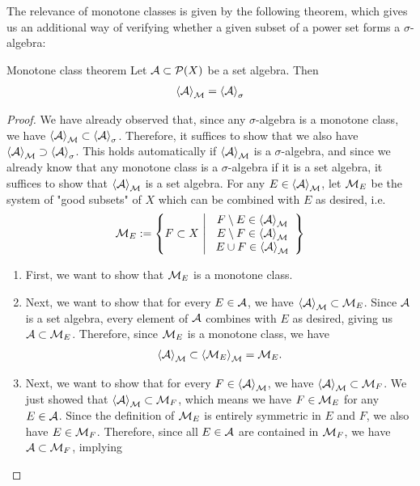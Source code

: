 The relevance of monotone classes is given by the following theorem, which gives us an additional way of verifying whether a given subset of a power set forms a $\sigma$-algebra:
\begin{importanttheorem}{Monotone class theorem}{}
	Let $\mathcal{A} \subset \mathcal{P}(X)$ be a set algebra. Then
	\begin{align*}
		\left\langle \mathcal{A} \right\rangle_{\mathcal{M}} 
		=
		\left\langle \mathcal{A} \right\rangle_\sigma
	\end{align*}
\end{importanttheorem}
\begin{proof}
	We have already observed that, since any $\sigma$-algebra is a monotone class, we have $\left\langle \mathcal{A} \right\rangle_{\mathcal{M}} \subset \left\langle \mathcal{A} \right\rangle_\sigma$. Therefore, it suffices to show that we also have $\left\langle \mathcal{A} \right\rangle_{\mathcal{M}} \supset \left\langle \mathcal{A} \right\rangle_\sigma$. This holds automatically if $\left\langle \mathcal{A} \right\rangle_{\mathcal{M}}$ is a $\sigma$-algebra, and since we already know that any monotone class is a $\sigma$-algebra if it is a set algebra, it suffices to show that $\left\langle \mathcal{A} \right\rangle_{\mathcal{M}}$ is a set algebra.
	\newpar
	For any $E \in \left\langle \mathcal{A} \right\rangle_{\mathcal{M}}$, let $\mathcal{M}_E$ be the system of "good subsets" of $X$ which can be combined with $E$ as desired, i.e.
	\begin{align*}
		\mathcal{M}_E := \qty{F \subset X ~\middle|~\begin{array}{c}
				F \setminus E \in \left\langle \mathcal{A}\right\rangle_{\mathcal{M}}\\
				E \setminus F \in \left\langle \mathcal{A}\right\rangle_{\mathcal{M}}\\
				E \cup F \in \left\langle \mathcal{A}\right\rangle_{\mathcal{M}}\end{array}}
	\end{align*}
	\begin{enumerate}
		\item First, we want to show that $\mathcal{M}_E$ is a monotone class.
		\item Next, we want to show that for every $E \in \mathcal{A}$, we have $\left\langle \mathcal{A} \right\rangle_{\mathcal{M}} \subset \mathcal{M}_E$. Since $\mathcal{A}$ is a set algebra, every element of $\mathcal{A}$ combines with $E$ as desired, giving us $\mathcal{A} \subset \mathcal{M}_E$. Therefore, since $\mathcal{M}_E$ is a monotone class, we have 
		\begin{align*}
			\left\langle \mathcal{A} \right\rangle_{\mathcal{M}} \subset \left\langle \mathcal{M}_E \right\rangle_{\mathcal{M}} = \mathcal{M}_E.
		\end{align*}
		\item Next, we want to show that for every $F \in \left\langle \mathcal{A} \right\rangle_{\mathcal{M}}$, we have $\left\langle \mathcal{A} \right\rangle_{\mathcal{M}} \subset \mathcal{M}_F$. We just showed that $\left\langle \mathcal{A} \right\rangle_{\mathcal{M}} \subset \mathcal{M}_F$, which means we have $F \in \mathcal{M}_E$ for any $E \in \mathcal{A}$. Since the definition of $\mathcal{M}_E$ is entirely symmetric in $E$ and $F$, we also have $E \in \mathcal{M}_F$. Therefore, since all $E \in \mathcal{A}$ are contained in $\mathcal{M}_F$, we have $\mathcal{A} \subset \mathcal{M}_F$, implying 

\end{enumerate}
\end{proof}
